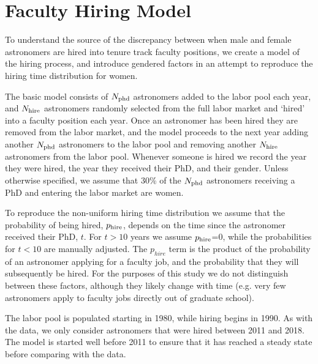 \documentclass[modern]{aastex62}
\begin{document}
\section{Faculty Hiring Model\label{model}}
To understand the source of the discrepancy between when male and female astronomers are hired into tenure track faculty positions, we create a model of the hiring process, and introduce gendered factors in an attempt to reproduce the hiring time distribution for women.

The basic model consists of $N_{\rm phd}$ astronomers added to the labor pool each year, and $N_{\rm hire}$ astronomers randomly selected from the full labor market and `hired' into a faculty position each year. Once an astronomer has been hired they are removed from the labor market, and the model proceeds to the next year adding another $N_{\rm phd}$ astronomers to the labor pool and removing another $N_{\rm hire}$ astronomers from the labor pool. Whenever someone is hired we record the year they were hired, the year they received their PhD, and their gender. Unless otherwise specified, we assume that 30\% of the $N_{\rm phd}$ astronomers receiving a PhD and entering the labor market are women. 

To reproduce the non-uniform hiring time distribution we assume that the probability of being hired, $p_{\rm hire}$, depends on the time since the astronomer received their PhD, $t$. For $t>10$ years we assume $p_{\rm hire}$=0, while the probabilities for $t<10$ are manually adjusted. The $p_{hire}$ term is the product of the probability of an astronomer applying for a faculty job, and the probability that they will subsequently be hired. For the purposes of this study we do not distinguish between these factors, although they likely change with time (e.g. very few astronomers apply to faculty jobs directly out of graduate school).

The labor pool is populated starting in 1980, while hiring begins in 1990. As with the data, we only consider astronomers that were hired between 2011 and 2018. The model is started well before 2011 to ensure that it has reached a steady state before comparing with the data.
\end{document}

